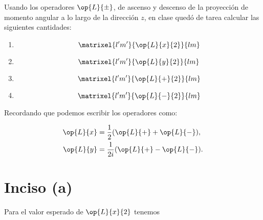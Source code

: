 \documentclass[../main.tex]{subfiles}
\begin{document}
\begin{problema}[10]
	Usando los operadores \(\op{L}{\pm}\), de ascenso y descenso de la
	proyección de momento angular a lo largo de la dirección \(z\),
	en clase quedó de tarea calcular las siguientes cantidades:

	\begin{enumerate}
		\item
		      \begin{equation*}
			      \matrixel{l^{\prime}m^{\prime}}{\op{L}{x}{2}}{lm}
		      \end{equation*}
		\item
		      \begin{equation*}
			      \matrixel{l^{\prime}m^{\prime}}{\op{L}{y}{2}}{lm}
		      \end{equation*}
		\item
		      \begin{equation*}
			      \matrixel{l^{\prime}m^{\prime}}{\op{L}{+}{2}}{lm}
		      \end{equation*}
		\item
		      \begin{equation*}
			      \matrixel{l^{\prime}m^{\prime}}{\op{L}{-}{2}}{lm}
		      \end{equation*}
	\end{enumerate}

	\startsolution

	Recordando que podemos escribir los operadores como:

	\begin{align*}
		\op{L}{x} & = \dfrac{1}{2}(\op{L}{+} + \op{L}{-}),  \\
		\op{L}{y} & = \dfrac{1}{2i}(\op{L}{+} - \op{L}{-}).
	\end{align*}

	\pagebreak
	\section*{Inciso (a)}

	Para el valor esperado de \(\op{L}{x}{2}\) tenemos


\end{problema}
\end{document}
